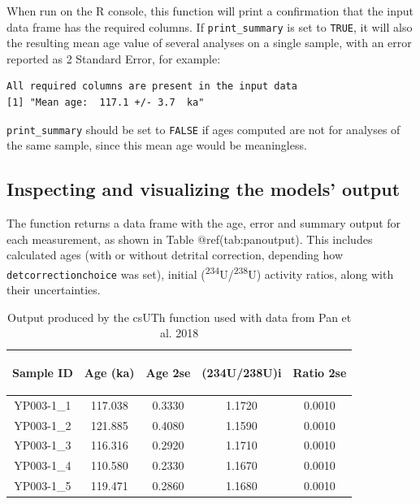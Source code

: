 \documentclass[]{elsarticle} %
\begin{document}
When run on the R console, this function will print a confirmation that the input data frame has the required columns. If \texttt{print\_summary} is set to \texttt{TRUE}, it will also the resulting mean age value of several analyses on a single sample, with an error reported as 2 Standard Error, for example:

\begin{verbatim}
All required columns are present in the input data
[1] "Mean age:  117.1 +/- 3.7  ka"
\end{verbatim}

\texttt{print\_summary} should be set to \texttt{FALSE} if ages computed are not for analyses of the same sample, since this mean age would be meaningless.

\hypertarget{inspecting-and-visualizing-the-models-output}{%
\subsection{Inspecting and visualizing the models' output}\label{inspecting-and-visualizing-the-models-output}}

The function returns a data frame with the age, error and summary output for each measurement, as shown in Table @ref(tab:panoutput). This includes calculated ages (with or without detrital correction, depending how \texttt{detcorrectionchoice} was set), initial (\textsuperscript{234}U/\textsuperscript{238}U) activity ratios, along with their uncertainties.

\begin{table}[ht]
\centering
\begin{tabular}{ccccc}
  \hline
\begin{sideways} Sample ID \end{sideways} & \begin{sideways} Age (ka) \end{sideways} & \begin{sideways} Age 2se \end{sideways} & \begin{sideways} (234U/238U)i \end{sideways} & \begin{sideways} Ratio 2se \end{sideways} \\ 
  \hline
YP003-1\_1 & 117.038 & 0.3330 & 1.1720 & 0.0010 \\ 
  YP003-1\_2 & 121.885 & 0.4080 & 1.1590 & 0.0010 \\ 
  YP003-1\_3 & 116.316 & 0.2920 & 1.1710 & 0.0010 \\ 
  YP003-1\_4 & 110.580 & 0.2330 & 1.1670 & 0.0010 \\ 
  YP003-1\_5 & 119.471 & 0.2860 & 1.1680 & 0.0010 \\ 
   \hline
\end{tabular}
\caption{\label{tab:panoutput}Output produced by the csUTh function used with data from Pan et al. 2018} 
\end{table}
\end{document}
